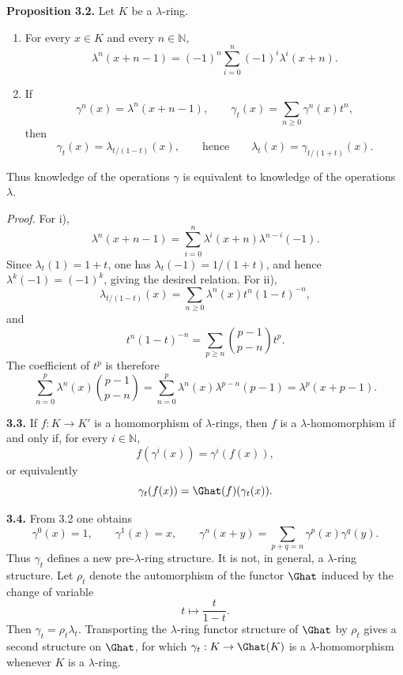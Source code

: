 \documentclass[11pt]{article}
\begin{document}
\textbf{Proposition 3.2.} Let \(K\) be a \(\lambda\)-ring.
\begin{enumerate}[label=\roman*)]
\item For every \(x\in K\) and every \(n\in\mathbb N\),
\[
  \lambda^n(x+n-1)=(-1)^n\sum_{i=0}^n(-1)^i\lambda^i(x+n).
\]
\item If
\[
  \gamma^n(x)=\lambda^n(x+n-1),\qquad
  \gamma_t(x)=\sum_{n\ge0}\gamma^n(x)t^n,
\]
then
\[
  \gamma_t(x)=\lambda_{t/(1-t)}(x),
  \qquad\text{hence}\qquad
  \lambda_t(x)=\gamma_{t/(1+t)}(x).
\]
\end{enumerate}
Thus knowledge of the operations \(\gamma\) is equivalent to knowledge of the operations \(\lambda\).

\emph{Proof.} For i),
\[
  \lambda^n(x+n-1)=\sum_{i=0}^{n}\lambda^i(x+n)\lambda^{n-i}(-1).
\]
Since \(\lambda_t(1)=1+t\), one has \(\lambda_t(-1)=1/(1+t)\), and hence \(\lambda^k(-1)=(-1)^k\), giving the desired relation. For ii),
\[
  \lambda_{t/(1-t)}(x)=\sum_{n\ge0}\lambda^n(x)t^n(1-t)^{-n},
\]
and
\[
  t^n(1-t)^{-n}=\sum_{p\ge n}\binom{p-1}{p-n}t^p.
\]
The coefficient of \(t^p\) is therefore
\[
  \sum_{n=0}^{p}\lambda^n(x)\binom{p-1}{p-n}
  =\sum_{n=0}^{p}\lambda^n(x)\lambda^{p-n}(p-1)
  =\lambda^p(x+p-1).
\]

\textbf{3.3.} If \(f:K\to K'\) is a homomorphism of \(\lambda\)-rings, then \(f\) is a \(\lambda\)-homomorphism if and only if, for every \(i\in\mathbb N\),
\[
  f(\gamma^i(x))=\gamma^i(f(x)),
\]
or equivalently
\[
  \gamma_t(f(x))=\Ghat(f)(\gamma_t(x)).
\]

\textbf{3.4.} From 3.2 one obtains
\begin{equation}\tag{3.4.1}
  \gamma^0(x)=1,
  \qquad \gamma^1(x)=x,
  \qquad \gamma^n(x+y)=\sum_{p+q=n}\gamma^p(x)\gamma^q(y).
\end{equation}
Thus \(\gamma_t\) defines a new pre-\(\lambda\)-ring structure. It is not, in general, a \(\lambda\)-ring structure. Let \(\rho_t\) denote the automorphism of the functor \(\Ghat\) induced by the change of variable
\[
  t\longmapsto \frac{t}{1-t}.
\]
Then \(\gamma_t=\rho_t\lambda_t\). Transporting the \(\lambda\)-ring functor structure of \(\Ghat\) by \(\rho_t\) gives a second structure on \(\Ghat\), for which \(\gamma_t:K\to\Ghat(K)\) is a \(\lambda\)-homomorphism whenever \(K\) is a \(\lambda\)-ring.
\end{document}
